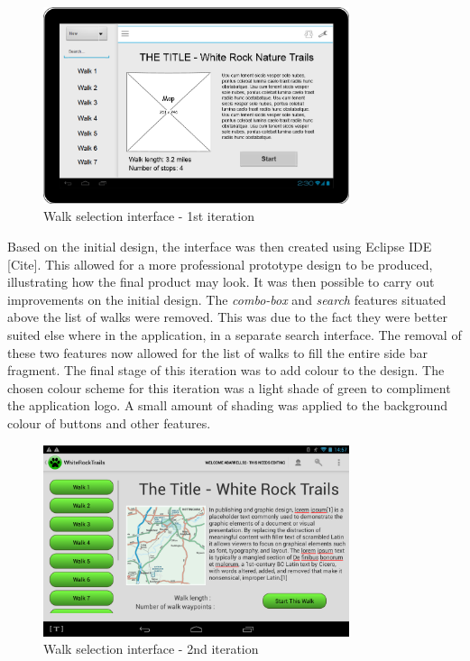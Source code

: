 \documentclass[11pt,a4paper]{report}
\begin{document}
\begin{figure}[H]
    \centering
    \includegraphics[width=0.8\textwidth]{chris/pencil_choose_walk}
    \caption{Walk selection interface - 1st iteration}
    \label{fig:choose_walk1}
\end{figure}

Based on the initial design, the interface was then created using Eclipse IDE [Cite]. This allowed for a more professional prototype design to be produced, illustrating how the final product may look. It was then possible to carry out improvements on the initial design. The \emph{combo-box} and \emph{search} features situated above the list of walks were removed. This was due to the fact they were better suited else where in the application, in a separate search interface. The removal of these two features now allowed for the list of walks to fill the entire side bar fragment. The final stage of this iteration was to add colour to the design. The chosen colour scheme for this iteration was a light shade of green to compliment the application logo. A small amount of shading was applied to the background colour of buttons and other features. 

\begin{figure}[H]
    \centering
    \includegraphics[width=0.8\textwidth]{chris/app_choose_walk}
    \caption{Walk selection interface - 2nd iteration}
    \label{fig:choose_walk2}
\end{figure}
\end{document}
